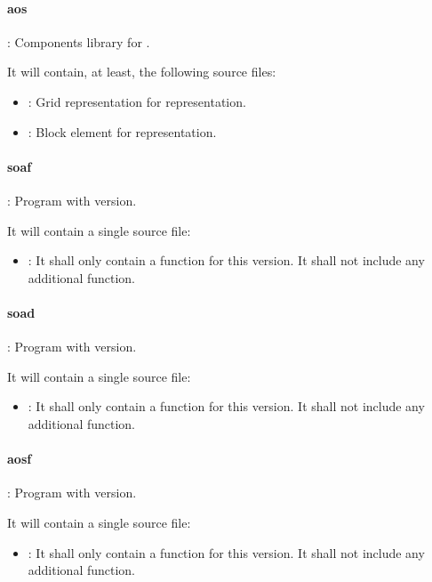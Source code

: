 \paragraph{aos}: Components library for .

It will contain, at least, the following source files:
\begin{itemize}
  \item {}: 
        Grid representation for  representation.
  \item {}: 
        Block element for  representation.
\end{itemize}

\paragraph{soaf}: Program with  version.

It will contain a single source file:
\begin{itemize}
  \item {}: 
        It shall only contain a  function for this version.
        It shall not include any additional function.
\end{itemize}

\paragraph{soad}: Program with  version.

It will contain a single source file:
\begin{itemize}
  \item {}: 
        It shall only contain a  function for this version.
        It shall not include any additional function.
\end{itemize}

\paragraph{aosf}: Program with  version.

It will contain a single source file:
\begin{itemize}
  \item {}: 
        It shall only contain a  function for this version.
        It shall not include any additional function.
\end{itemize}

